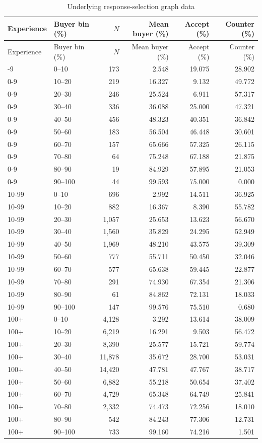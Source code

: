 \documentclass[11pt,a4paper]{article}
\begin{document}
\normalsize

\small
\begin{longtable}{llrrrr}
\caption{Underlying response-selection graph data}\label{tab:selection}\\
\toprule
Experience & Buyer bin (\%) & $N$ & Mean buyer (\%) & Accept (\%) & Counter (\%) \\
\midrule\endfirsthead
\toprule
Experience & Buyer bin (\%) & $N$ & Mean buyer (\%) & Accept (\%) & Counter (\%) \\
\midrule\endhead
\bottomrule\endfoot
0-9 & 0--10 & 173 & 2.548 & 19.075 & 28.902 \\
0-9 & 10--20 & 219 & 16.327 & 9.132 & 49.772 \\
0-9 & 20--30 & 246 & 25.524 & 6.911 & 57.317 \\
0-9 & 30--40 & 336 & 36.088 & 25.000 & 47.321 \\
0-9 & 40--50 & 456 & 48.323 & 40.351 & 36.842 \\
0-9 & 50--60 & 183 & 56.504 & 46.448 & 30.601 \\
0-9 & 60--70 & 157 & 65.666 & 57.325 & 26.115 \\
0-9 & 70--80 & 64 & 75.248 & 67.188 & 21.875 \\
0-9 & 80--90 & 19 & 84.929 & 57.895 & 21.053 \\
0-9 & 90--100 & 44 & 99.593 & 75.000 & 0.000 \\
10-99 & 0--10 & 696 & 2.992 & 14.511 & 36.925 \\
10-99 & 10--20 & 882 & 16.367 & 8.390 & 55.782 \\
10-99 & 20--30 & 1,057 & 25.653 & 13.623 & 56.670 \\
10-99 & 30--40 & 1,560 & 35.829 & 24.295 & 52.949 \\
10-99 & 40--50 & 1,969 & 48.210 & 43.575 & 39.309 \\
10-99 & 50--60 & 777 & 55.711 & 50.450 & 32.046 \\
10-99 & 60--70 & 577 & 65.638 & 59.445 & 22.877 \\
10-99 & 70--80 & 291 & 74.930 & 67.354 & 21.306 \\
10-99 & 80--90 & 61 & 84.862 & 72.131 & 18.033 \\
10-99 & 90--100 & 147 & 99.576 & 75.510 & 0.680 \\
100+ & 0--10 & 4,128 & 3.292 & 13.614 & 38.009 \\
100+ & 10--20 & 6,219 & 16.291 & 9.503 & 56.472 \\
100+ & 20--30 & 8,390 & 25.577 & 15.721 & 59.774 \\
100+ & 30--40 & 11,878 & 35.672 & 28.700 & 53.031 \\
100+ & 40--50 & 14,420 & 47.781 & 47.767 & 38.717 \\
100+ & 50--60 & 6,882 & 55.218 & 50.654 & 37.402 \\
100+ & 60--70 & 4,729 & 65.348 & 64.749 & 25.841 \\
100+ & 70--80 & 2,332 & 74.473 & 72.256 & 18.010 \\
100+ & 80--90 & 542 & 84.243 & 77.306 & 12.731 \\
100+ & 90--100 & 733 & 99.160 & 74.216 & 1.501 \\
\end{longtable}
\normalsize
\end{document}
